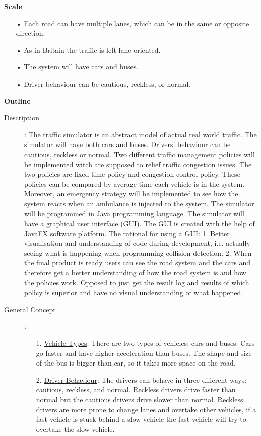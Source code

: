 \documentclass[11pt]{article}
\begin{document}
\textbf{Scale}
\begin{itemize}
\item[•] Each road can have multiple lanes, which can be in the same or opposite direction.
\item[•] As in Britain the traffic is left-lane oriented.
\item[•] The system will have cars and buses.
\item[•] Driver behaviour can be cautious, reckless, or normal.
\end{itemize}

\textbf{Outline}
\begin{description}
\item[Description]:
The traffic simulator is an abstract model of actual real world traffic. The simulator will have both cars and buses. Drivers' behaviour can be cautious, reckless or normal. Two different traffic management policies will be implemented witch are supposed to relief traffic congestion issues. The two policies are fixed time policy and congestion control policy. These policies can be compared by average time each vehicle is in the system. Moreover, an emergency strategy will be implemented to see how the system reacts when an ambulance is injected to the system. 
\newline
The simulator will be programmed in Java programming language. The simulator will have a graphical user interface (GUI). The GUI is created with the help of JavaFX software platform. The rational for using a GUI: 1. Better visualisation and understanding of code during development, i.e. actually seeing what is happening when programming collision detection. 2. When the final product is ready users can see the road system and the cars and therefore get a better understanding of how the road system is and how the policies work. Opposed to just get the result log and results of which policy is superior and have no visual understanding of what happened. 
\item[General Concept]:
	\begin{itemize}
		\item[1. ]\underline{Vehicle Types}: There are two types of vehicles: cars and buses. Cars go faster and have higher acceleration than buses. The shape and size of the bus is bigger than car, so it takes more space on the road.
		
		\item[2. ] \underline{Driver Behaviour}: The drivers can behave in three different ways: cautious, reckless, and normal. Reckless drivers drive faster than normal but the cautious drivers drive slower than normal. Reckless drivers are more prone to change lanes and overtake other vehicles, if a fast vehicle is stuck behind a slow vehicle the fast vehicle will try to overtake the slow vehicle.


\end{itemize}
\end{description}
\end{document}
